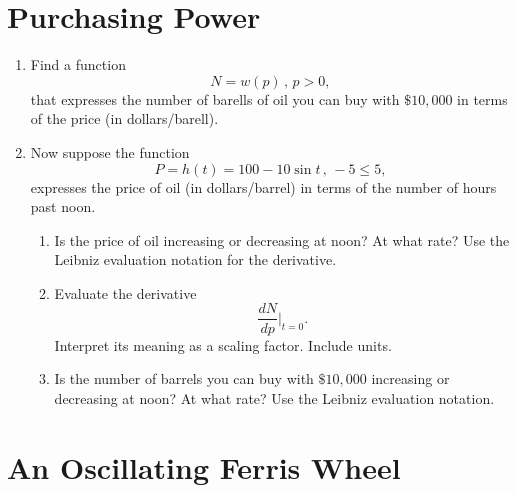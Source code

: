 \documentclass{ximera}
\begin{document}
\section{Purchasing Power}
\begin{question} \label{Qpdf3r3r0}
\begin{enumerate}

\item Find a function
\[
    N = w(p) \, , \, p>0 ,
\]
that expresses the number of barells of oil you can buy with $\$10,000$ in terms of the price (in dollars/barell).

\item Now suppose the function
\[
        P = h(t)  = 100-10\sin t \, , \, -5 \leq 5 ,
\]
expresses the price of oil (in dollars/barrel) in terms of the number of hours past noon.

\begin{enumerate}

\item Is the price of oil increasing or decreasing at noon? At what rate? Use the Leibniz evaluation notation for the derivative.

\item Evaluate the derivative 
\[
  \frac{dN}{dp}\Big|_{t=0}.
\]
Interpret its meaning as a scaling factor. Include units.

\item Is the number of barrels you can buy with $\$10,000$ increasing or decreasing at noon? At what rate? Use the Leibniz evaluation notation. 
\end{enumerate}

\end{enumerate}
\end{question}

\section{An Oscillating Ferris Wheel}
\end{document}
